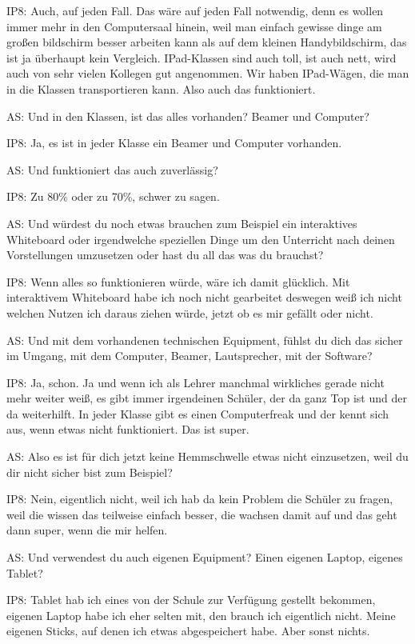 \documentclass[fontsize=11pt,paper=a4]{scrbook}
\begin{document}
{\begin{itemize*}
		\item[IP8:] Auch, auf jeden Fall. Das wäre auf jeden Fall notwendig, denn es wollen immer mehr in den Computersaal hinein, weil man einfach gewisse dinge am großen bildschirm besser arbeiten kann als auf dem kleinen Handybildschirm, das ist ja überhaupt kein Vergleich. IPad-Klassen sind
		auch toll, ist auch nett, wird auch von
		sehr vielen Kollegen gut angenommen. Wir haben IPad-Wägen, die man in die Klassen transportieren kann. Also auch das funktioniert.
		\item[AS:] Und in den Klassen, ist das alles vorhanden? Beamer und Computer?
		\item[IP8:] Ja, es ist in jeder Klasse ein Beamer und Computer vorhanden.
		\item[AS:] Und funktioniert das auch zuverlässig?
		\item[IP8:] Zu 80\% oder zu 70\%, schwer zu sagen.
		\item[AS:] Und würdest du noch etwas
		brauchen zum Beispiel ein interaktives
		Whiteboard oder irgendwelche speziellen
		Dinge um den Unterricht nach deinen Vorstellungen
		umzusetzen oder hast du all das was du
		brauchst?
		\item[IP8:] Wenn alles so funktionieren würde, wäre ich damit glücklich. Mit interaktivem Whiteboard habe ich noch nicht gearbeitet deswegen weiß ich nicht
		welchen Nutzen ich daraus ziehen würde, jetzt
		ob es mir gefällt oder nicht.
		\item[AS:] Und mit dem vorhandenen technischen
		Equipment, fühlst du dich das sicher im 
		Umgang, mit dem Computer, Beamer, Lautsprecher, mit
		der Software?
		\item[IP8:] Ja, schon. Ja und wenn ich als Lehrer manchmal wirkliches gerade nicht mehr weiter weiß, es gibt immer irgendeinen Schüler, der da ganz Top ist und der da weiterhilft. In jeder Klasse gibt es einen Computerfreak und der kennt sich aus, wenn etwas nicht funktioniert. Das ist super.
		\item[AS:] Also es ist für dich jetzt keine Hemmschwelle etwas nicht 
		einzusetzen, weil du dir nicht sicher bist zum
		Beispiel?
		\item[IP8:] Nein, eigentlich nicht, weil ich hab da kein Problem die Schüler zu fragen, weil die wissen das teilweise einfach besser, die wachsen damit auf und das geht dann super, wenn die mir helfen.
		\item[AS:] Und verwendest du auch eigenen Equipment? Einen eigenen Laptop, eigenes Tablet?
		\item[IP8:] Tablet hab ich eines von der Schule zur Verfügung gestellt bekommen, eigenen Laptop habe ich eher selten mit, den brauch ich eigentlich nicht. Meine eigenen Sticks, auf denen ich etwas abgespeichert habe. Aber sonst nichts.

\end{itemize*}}
\end{document}

